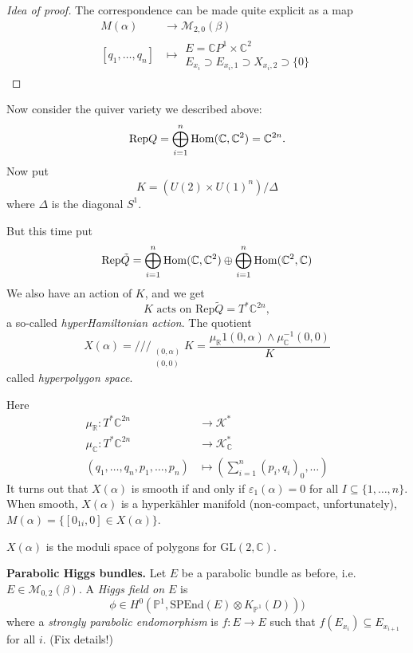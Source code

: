 \begin{proof}[Idea of proof]
The correspondence can be made quite explicit
as a map
$$
\begin{aligned}
M(\alpha) &\longrightarrow
\mathcal{M}_{2,0}(\beta) \\
[q_1,\ldots,q_n] &\longmapsto
\substack{E=\mathbb{C}P^{1}\times\mathbb{C}^2
 \\ E_{x_i}\supset E_{x_i,1}\supset
 X_{x_i,2}\supset \{0\}}\end{aligned}
$$

\end{proof}

\medskip\noindent
Now consider the quiver variety we described
above:
$$
\text{Rep}Q=\bigoplus_{i=1}^n
\mathop{\mathrm{Hom}}\nolimits(\mathbb{C},\mathbb{C}^2)=\mathbb{C}^{2n}
.
$$
Now put
$$
K=(U(2) \times U(1)^n)/\Delta
$$
where $\Delta$ is the diagonal $S^1$.

But this time put
$$
\text{Rep}\tilde{Q}=\bigoplus_{i=1}^n
\mathop{\mathrm{Hom}}\nolimits(\mathbb{C},\mathbb{C}^2)
\oplus \bigoplus_{i=1}^n
\mathop{\mathrm{Hom}}\nolimits(\mathbb{C}^2,\mathbb{C})
$$
We also have an action of $K$, and we get
$$
K\text{ acts on }\text{Rep}\tilde{Q} = T^*
\mathbb{C}^{2n},
$$
a so-called {\it hyperHamiltonian action}.
The quotient
$$
X(\alpha)=/\!/\!/_{\substack{(0,\alpha) \\
(0,0)}}K=
\frac{\mu_{\mathbb{R}}1(0,\alpha) \wedge
\mu^{-1}_{\mathbb{C}}(0,0)}{K}
$$
called {\it hyperpolygon space}.

Here
$$
\begin{aligned}
\mu_\mathbb{R}:T^*\mathbb{C}^{2n}&\to
\mathcal{K}^* \\
\mu_{\mathbb{C}}:T^*\mathbb{C}^{2n}&  \to
\mathcal{K}_{\mathbb{C}}^* \\
(q_1,\ldots,q_n,p_1,\ldots,p_n)&  \mapsto
(\sum_{i=1}^n(p_i,q_i)_0,\ldots)
\end{aligned}
$$
It turns out that $X(\alpha)$ is smooth
if and only if $\varepsilon_1(\alpha)=0$ for
all
$I \subseteq \{ 1,\ldots,n\}$.
When smooth,  $X(\alpha)$ is a hyperkähler
manifold
(non-compact, unfortunately),
$M(\alpha)=\{[0_{1i},0] \in X(\alpha)\}$.

\begin{theorem}[Boalch]
\label{theorem-Boalch}
$X(\alpha)$ is the moduli space of polygons
for $\text{GL}(2,\mathbb{C})$.
\end{theorem}

\medskip\noindent
{\bf Parabolic Higgs bundles.}
Let $E$ be a parabolic bundle as before, i.e.
$E \in \mathcal{M}_{0,2}(\beta)$.
A {\it Higgs field on $E$} is
$$
\phi \in H^{0}(\mathbb{P}^1,\text{SPEnd}(E)
\otimes K_{\mathbb{P}^1}(D)))
$$
where a {\it strongly parabolic endomorphism}
is  $f:E \to E$
such that $f(E_{x_i})\subseteq E_{x_{i+1}}$
for all $i$.
(Fix details!)

